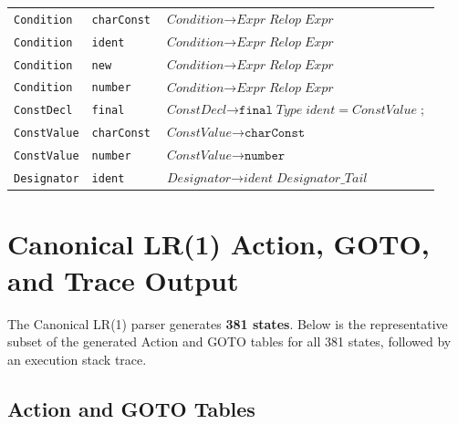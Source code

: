 \documentclass[11pt,a4paper]{article}
\begin{document}
\begin{center}
\begin{tabular}{|L{3.8cm}|L{2.4cm}|L{8.2cm}|}
\texttt{Condition} & \texttt{charConst} & $\textit{Condition} \rightarrow \textit{Expr}\;\textit{Relop}\;\textit{Expr}$ \\
\texttt{Condition} & \texttt{ident} & $\textit{Condition} \rightarrow \textit{Expr}\;\textit{Relop}\;\textit{Expr}$ \\
\texttt{Condition} & \texttt{new} & $\textit{Condition} \rightarrow \textit{Expr}\;\textit{Relop}\;\textit{Expr}$ \\
\texttt{Condition} & \texttt{number} & $\textit{Condition} \rightarrow \textit{Expr}\;\textit{Relop}\;\textit{Expr}$ \\
\texttt{ConstDecl} & \texttt{final} & $\textit{ConstDecl} \rightarrow \texttt{final}\;\textit{Type}\;\textit{ident}\;\texttt{=}\;\textit{ConstValue}\;\texttt{;}$ \\
\texttt{ConstValue} & \texttt{charConst} & $\textit{ConstValue} \rightarrow \texttt{charConst}$ \\
\texttt{ConstValue} & \texttt{number} & $\textit{ConstValue} \rightarrow \texttt{number}$ \\
\texttt{Designator} & \texttt{ident} & $\textit{Designator} \rightarrow \textit{ident}\;\textit{Designator\_Tail}$ \\
\hline
\end{tabular}
\end{center}

\newpage
\section{Canonical LR(1) Action, GOTO, and Trace Output}

The Canonical LR(1) parser generates \textbf{381 states}. Below is the representative subset of the generated Action and GOTO tables for all 381 states, followed by an execution stack trace.

\subsection{Action and GOTO Tables}
\end{document}
